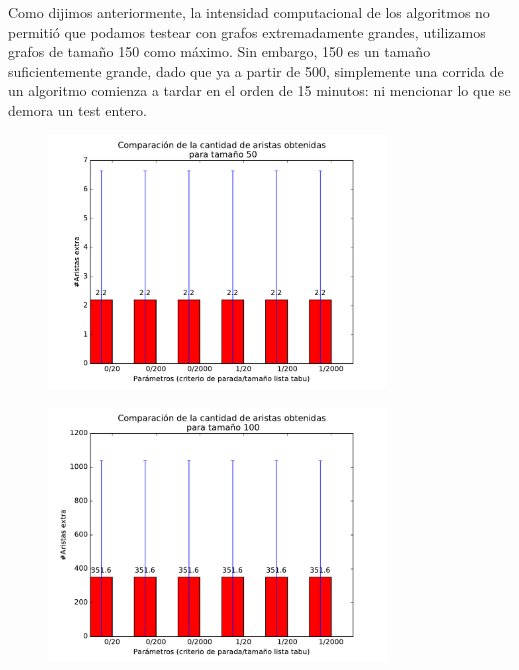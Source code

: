 Como dijimos anteriormente, la intensidad computacional de los algoritmos no permitió que podamos testear con grafos extremadamente grandes, utilizamos grafos de tamaño 150 como máximo. Sin embargo, 150 es un tamaño suficientemente grande, dado que ya a partir de 500, simplemente una corrida de un algoritmo comienza a tardar en el orden de 15 minutos: ni mencionar lo que se demora un test entero.


\begin{figure}[H]
 \centering
	\includegraphics[width=0.8\textwidth]{graficos/problema_6/calidad0.pdf}
	\caption{}
	\label{fig:problema6-calidad0}
\end{figure}


\begin{figure}[H]
 \centering
	\includegraphics[width=0.8\textwidth]{graficos/problema_6/calidad1.pdf}
	\caption{}
	\label{fig:problema6-calidad1}
\end{figure}

